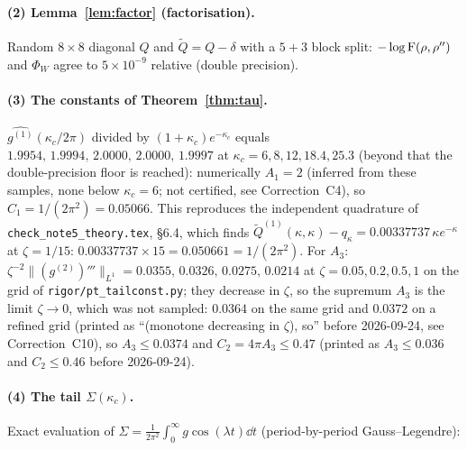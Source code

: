 \documentclass[11pt]{article}
\begin{document}
\paragraph{(2) Lemma~\ref{lem:factor} (factorisation).}  Random $8\times8$ diagonal $Q$ and
$\widetilde Q=Q-\delta$ with a $5{+}3$ block split:
$-\log\operatorname{F}(\rho,\rho'')$ and $\Phi_W$ agree to $5\times10^{-9}$ relative (double precision).

\paragraph{(3) The constants of Theorem~\ref{thm:tau}.}  $\widehat{g^{(1)}}(\kappa_c/2\pi)$ divided by
$(1+\kappa_c)e^{-\kappa_c}$ equals $1.9954,\,1.9994,\,2.0000,\,2.0000,\,1.9997$ at
$\kappa_c=6,8,12,18.4,25.3$ (beyond that the double-precision floor is reached): numerically $A_1=2$ (inferred from these samples, none below $\kappa_c=6$; not certified, see Correction~C4), so
$C_1=1/(2\pi^2)=0.05066$.  This reproduces the independent quadrature of
\texttt{check\_note5\_theory.tex}, \S6.4, which finds
$\widetilde Q^{(1)}(\kappa,\kappa)-q_\kappa=0.00337737\,\kappa e^{-\kappa}$ at $\zeta=1/15$:
$0.00337737\times15=0.050661=1/(2\pi^2)$.  For $A_3$: $\zeta^{-2}\|(g^{(2)})'''\|_{L^1}
=0.0355,\,0.0326,\,0.0275,\,0.0214$ at $\zeta=0.05,0.2,0.5,1$ on the grid of \texttt{rigor/pt\_tailconst.py}; they decrease in $\zeta$, so the supremum $A_3$ is the limit $\zeta\to0$, which was not sampled: $0.0364$ on the same grid and $0.0372$ on a refined grid (printed as ``(monotone decreasing in $\zeta$), so'' before 2026-09-24, see Correction~C10), so
$A_3\le0.0374$ and $C_2=4\pi A_3\le0.47$ (printed as $A_3\le0.036$ and $C_2\le0.46$ before 2026-09-24).

\paragraph{(4) The tail $\Sigma(\kappa_c)$.}  Exact evaluation of
$\Sigma=\frac1{2\pi^2}\int_0^\infty g\cos(\lambda t)\dd t$ (period-by-period Gauss--Legendre):
\end{document}
